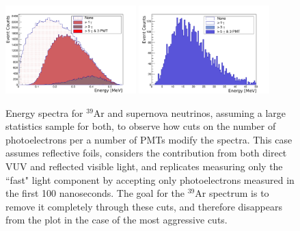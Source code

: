 \documentclass[a4paper]{article}
\begin{document}
\begin{figure}[H]
\center
\includegraphics[width=0.45\textwidth]{ar39_energy_spectrum_60pmts_fastlight_labels.pdf}
\includegraphics[width=0.45\textwidth]{sn_energy_spectrum_60pmts_fastlight_labels.pdf}
\caption{Energy spectra for $^{39}$Ar and supernova neutrinos, assuming a large statistics sample for both, to observe how cuts on the number of photoelectrons per a number of PMTs modify the spectra. This case assumes reflective foils, considers the contribution from both direct VUV and reflected visible light, and replicates measuring only the ``fast" light component by accepting only photoelectrons measured in the first 100 nanoseconds. The goal for the $^{39}$Ar spectrum is to remove it completely through these cuts, and therefore disappears from the plot in the case of the most aggressive cuts. }\label{scint_energy_cuts_fastlight}
\end{figure}
\end{document}
